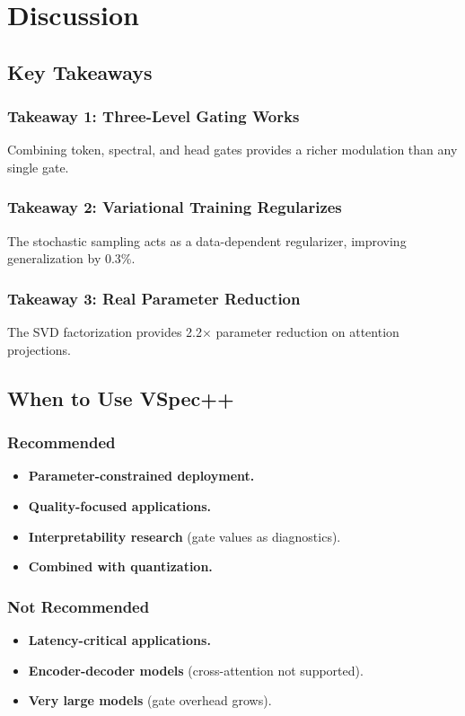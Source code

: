 \section{Discussion}

\subsection{Key Takeaways}

\subsubsection{Takeaway 1: Three-Level Gating Works}

Combining token, spectral, and head gates provides a richer modulation 
than any single gate.

\subsubsection{Takeaway 2: Variational Training Regularizes}

The stochastic sampling acts as a data-dependent regularizer, improving 
generalization by 0.3\%.

\subsubsection{Takeaway 3: Real Parameter Reduction}

The SVD factorization provides 2.2$\times$ parameter reduction on 
attention projections.

\subsection{When to Use VSpec++}

\subsubsection{Recommended}
\begin{itemize}
\item \textbf{Parameter-constrained deployment.}
\item \textbf{Quality-focused applications.}
\item \textbf{Interpretability research} (gate values as diagnostics).
\item \textbf{Combined with quantization.}

\end{itemize}
\subsubsection{Not Recommended}
\begin{itemize}
\item \textbf{Latency-critical applications.}
\item \textbf{Encoder-decoder models} (cross-attention not supported).
\item \textbf{Very large models} (gate overhead grows).

\end{itemize}
